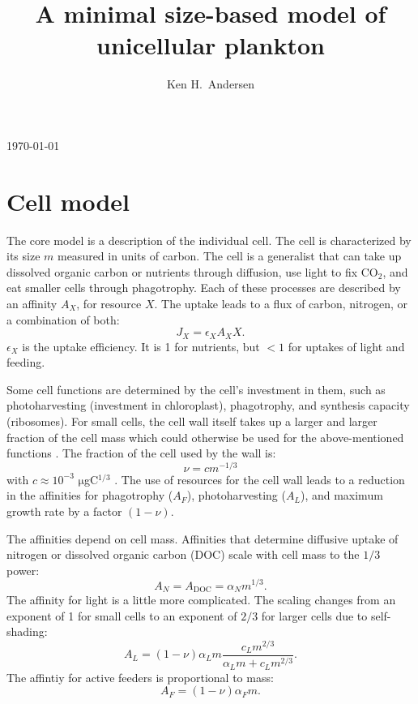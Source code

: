 \documentclass[11pt]{article}
\newcommand{\DOC}{\mathrm{DOC}}
\newcommand{\mmu}{$\mathrm{\mu}$}
\begin{document}
\title{A minimal size-based model of unicellular plankton}
\author{Ken H.~Andersen}
\today
\maketitle

\section*{Cell model}
The core model is a description of the individual cell.  The cell is characterized by its size $m$ measured in units of carbon.  The cell is a generalist that can take up dissolved organic carbon or nutrients through diffusion, use light to fix CO$_2$, and eat smaller cells through phagotrophy.   Each of these processes are described by an affinity $A_X$, for resource $X$.  The uptake leads to a flux of carbon, nitrogen, or a combination of both:
\begin{equation}
  J_X = \epsilon_X A_X X.
\end{equation}
$\epsilon_X$ is the uptake efficiency. It is 1 for nutrients, but $<1$ for uptakes of light and feeding.

Some cell functions are determined by the cell's investment in them, such as photoharvesting (investment in chloroplast), phagotrophy, and synthesis capacity (ribosomes).  For small cells, the cell wall itself takes up a larger and larger fraction of the cell mass which could otherwise be used for the above-mentioned functions \citep{Raven1994, Maranon2015}.  The fraction of the cell used by the wall is:
\begin{equation}
  \label{eq:nu}
  \nu = c m^{-1/3}  
\end{equation}
with $c \approx 10^{-3}$ {\mmu}gC$^{1/3}$ \citep{Andersen2015}.  The use of resources for the cell wall leads to a reduction in the affinities for phagotrophy ($A_F$), photoharvesting ($A_L$), and maximum growth rate by a factor $(1-\nu)$.

The affinities depend on cell mass.  Affinities that determine diffusive uptake of nitrogen or dissolved organic carbon (DOC) scale with cell mass to the $1/3$ power:
\begin{equation}
  \label{eq:AN}
  A_N = A_\DOC = \alpha_N m^{1/3}.
\end{equation}
The affinity for light is a little more complicated. The scaling changes from an exponent of 1 for small cells to an exponent of $2/3$ for larger cells due to self-shading:
\begin{equation}
  \label{eq:AL}
  A_L = (1-\nu) \alpha_L m \frac{c_L m^{2/3}}{\alpha_L m + c_L m^{2/3}}.
\end{equation}
The affintiy for active feeders is proportional to mass:
\begin{equation}
  \label{eq:AF}
  A_F = (1-\nu) \alpha_F m.
\end{equation}
\end{document}
